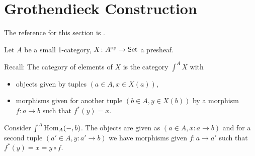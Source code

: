 \section{Grothendieck Construction}

The reference for this section is \cite[B.1.2, B.1.3]{Elephant_JOH02}.

Let $ A $ be a small 1-category, $ X \colon A^{ \operatorname{op} } \to \operatorname{Set} $ a presheaf.

Recall: 
The category of elements of $ X $ is the category 
$ \int^A X $ with 
\begin{itemize}
	\item 
	objects given by tuples $ ( a \in A , x \in X ( a ) ) $,
	
	\item 
	morphisms given for another tuple $ ( b \in A , y \in X ( b ) ) $
	by a morphism $ f \colon a \to b$ such that $ f^* ( y ) = x $. 
\end{itemize}

\begin{exmp}	
	Consider $ \int^A \operatorname{Hom}_A (- , b ) $.
	The objects are given as $ ( a \in A , x \colon a \to b ) $ 
	and for a second tuple $ ( a' \in A , y \colon a' \to b ) $
	we have morphisms given $ f \colon a \to a' $ such that $ f^* ( y ) = x = y \circ f $.
\end{exmp}

